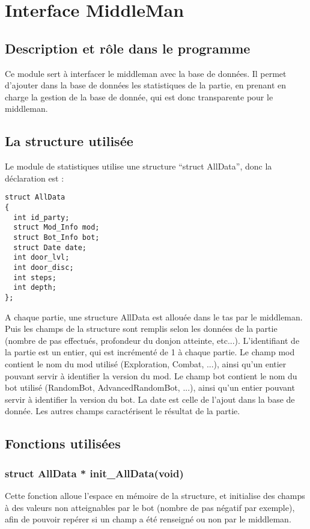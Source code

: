 \section{Interface MiddleMan} 

\subsection{Description et rôle dans le programme}
Ce module sert à interfacer le middleman avec la base de données. Il permet d'ajouter dans la base de données les statistiques de la partie, en prenant en charge la gestion de la base de donnée, qui est donc transparente pour le middleman.
\subsection{La structure utilisée}
Le module de statistiques utilise une structure ``struct AllData'', donc la déclaration est :\\
\begin{verbatim}
struct AllData
{
  int id_party;
  struct Mod_Info mod;
  struct Bot_Info bot;
  struct Date date;
  int door_lvl;
  int door_disc;
  int steps;
  int depth;
};
\end{verbatim}
A chaque partie, une structure AllData est allouée dans le tas par le middleman. Puis les champs de la structure sont remplis selon les données de la partie (nombre de pas effectués, profondeur du donjon atteinte, etc...). L'identifiant de la partie est un entier, qui est incrémenté de 1 à chaque partie. Le champ mod contient le nom du mod utilisé (Exploration, Combat, ...), ainsi qu'un entier pouvant servir à identifier la version du mod. Le champ bot contient le nom du bot utilisé (RandomBot, AdvancedRandomBot, ...), ainsi qu'un entier pouvant servir à identifier la version du bot. La date est celle de l'ajout dans la base de donnée. Les autres champs caractérisent le résultat de la partie.
\subsection{Fonctions utilisées}
\subsubsection*{struct AllData * init\_AllData(void)}
Cette fonction alloue l'espace en mémoire de la structure, et initialise des champs à des valeurs non atteignables par le bot (nombre de pas négatif par exemple), afin de pouvoir repérer si un champ a été renseigné ou non par le middleman.
